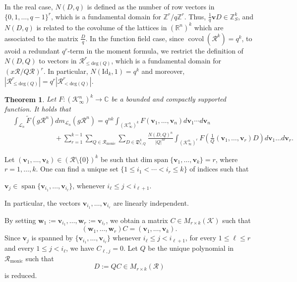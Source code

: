 \documentclass[11pt,a4paper,reqno]{amsart}
\def\deg{\mathrm{deg}}
\def\dim{\mathrm{dim}}
\newcommand{\Rmo}{\mathcal R_{\text{monic}}}
\newtheorem{theorem}{Theorem}[section]
\theoremstyle{definition}
\theoremstyle{remark}
\numberwithin{equation}{section}
\begin{document}
In the real case, $N(D,q)$ is defined as the number of row vectors in $\{0,1,\ldots, q-1\}^r$, which is a fundamental domain for $\mathbb Z^r/q\mathbb Z^r$. Thus, $\frac 1 q \mathbf{v} D\in \mathbb Z_S^k$, and $N(D,q)$ is related to the covolume of the lattices in $(\mathbb R^n)^k$ which are associated to the matrix $\frac D q$.
In the function field case, since $\operatorname{covol}(\mathcal R^k)=q^{k}$, to avoid a redundant $q^r$-term in the moment formula, we restrict the definition of $N(D,Q)$ to vectors in $\mathcal R^r_{\le \deg(Q)}$, which is a fundamental domain for $(x\mathcal R/Q\mathcal R)^r$. In particular, $N(\mathrm{Id}_k, 1)=q^{k}$ and moreover, $\left| \mathcal{R}^r_{\leq \deg(Q)}\right|=q^r\left| \mathcal{R}_{<\deg(Q)}^r\right|$.
\begin{theorem}\label{thm:kMomentsForm} 
Let $F:(\mathcal K_\infty^n)^k\rightarrow \mathbb C$ be a bounded and compactly supported function. It holds that
        \begin{equation}\begin{split}
    \label{eqn:Rogersk}
&\int_{\mathcal{L}_n} \widetilde{F} (g\mathcal R^n) dm_{\mathcal{L}_n}(g\mathcal R^n) 
=
q^{nk}\int_{(\mathcal{K}_{\infty}^n)^k} F(\mathbf v_1, \ldots, \mathbf v_n) d\mathbf v_1 \cdots d\mathbf v_n\\
&\hspace{1in}
+\sum_{r=1}^{k-1}\sum_{Q\in \Rmo}\sum_{D\in \mathfrak{D}^k_{r,Q}}
\frac{N(D,Q)^n}{\vert Q\vert^{nr}}\int_{\left(\mathcal{K}_{\infty}^n\right)^r}F\left(\frac{1}{Q}(\mathbf{v}_1,\dots,\mathbf{v}_r)D\right)d\mathbf{v}_1\dots d\mathbf{v}_r.\end{split}\end{equation}
\end{theorem}
Let $(\mathbf v_1, \ldots, \mathbf v_k)\in ( \mathcal{R}\setminus\{0\})^k$ be such that $\dim \operatorname{span}\{\mathbf v_1, \ldots, \mathbf v_k\}=r$, where $r=1, \ldots, k$. One can find a unique set $\{1\le i_1 < \cdots < i_r\le k\}$ of indices such that 
\begin{center}
$\mathbf{v}_j\in \operatorname{span}\{\mathbf{v}_{i_1},\dots,\mathbf{v}_{i_\ell}\}$, whenever $i_{\ell}\leq j<i_{\ell+1}$. 
\end{center}
In particular, the vectors $\mathbf v_{i_1}, \ldots, \mathbf v_{i_r}$ are linearly independent.

By setting $\mathbf{w}_1:=\mathbf{v}_{i_1},\dots,\mathbf{w}_r:=\mathbf{v}_{i_r}$, we obtain a matrix $C\in M_{r\times k}(\mathcal{K})$ such that 
\begin{equation}
    (\mathbf{w}_1,\dots,\mathbf{w}_r)C=(\mathbf{v}_1,\dots,\mathbf{v}_k).
\end{equation}
Since $\mathbf{v}_j$ is spanned by $\{\mathbf{v}_{i_1},\dots,\mathbf{v}_{i_{\ell}}\}$ whenever $i_{\ell}\leq j<i_{\ell+1}$, for every $1\leq \ell\leq r$ and every $1\leq j<i_{\ell}$, we have $C_{\ell,j}=0$. Let $Q$ be the unique polynomial in $\Rmo$ such that
$$D:=QC\in M_{r\times k}(\mathcal{R})$$ is reduced.
\end{document}
